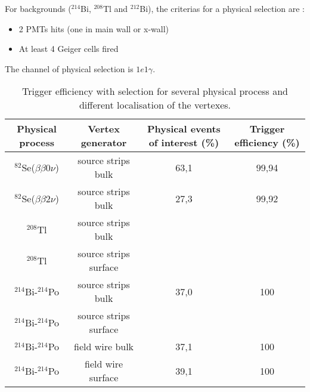 \documentclass[12pt,a4paper]{article}
\newcommand{\BBZN}{$\beta\beta{}0\nu$}
\newcommand{\BBDN}{$\beta\beta{}2\nu$}
\newcommand{\SE}{$^{82}$Se}
\newcommand{\TL}{$^{208}$Tl}
\newcommand{\BIQ}{$^{214}$Bi}
\newcommand{\BID}{$^{212}$Bi}
\newcommand{\POQ}{$^{214}$Po}
\begin{document}
For backgrounds (\BIQ, \TL{} and \BID), the criterias for a physical selection are :
\begin{itemize}
 \item 2 PMTs hits (one in main wall or x-wall)
 \item At least 4 Geiger cells fired
\end{itemize}
The channel of physical selection is $1e1\gamma$.

\begin{table}[!h]
 \begin{center}
  \begin{tabular}{|c||c|c|c|}
    \hline
    Physical process   & Vertex generator      & Physical events of interest (\%) & Trigger efficiency (\%)  \\
    \hline
    \SE(\BBZN)         & source strips bulk    & 63,1                             & 99,94                    \\
    \SE(\BBDN)         & source strips bulk    & 27,3                             & 99,92                    \\
    \TL                & source strips bulk    &                                  &                      \\
    \TL                & source strips surface &   &     \\
    \BIQ-\POQ          & source strips bulk    & 37,0                             & 100                      \\
    \BIQ-\POQ          & source strips surface &  &     \\
    \BIQ-\POQ          & field wire bulk       & 37,1                             & 100                      \\
    \BIQ-\POQ          & field wire surface    & 39,1                             & 100                      \\
    \hline
  \end{tabular}
  \end{center}
  \caption{Trigger efficiency with selection for several physical process and different localisation of the vertexes.}
\label{poi_efficacity_trigger}
\end{table}
\end{document}
